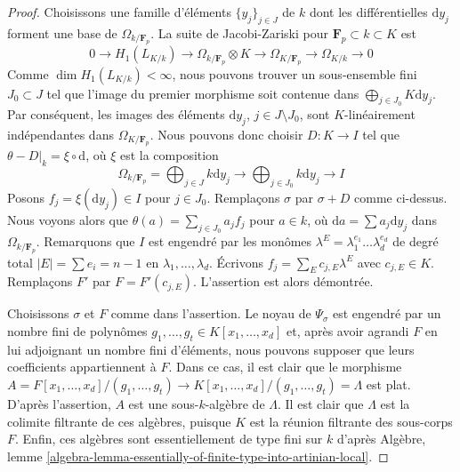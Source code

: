 \begin{proof}
\medskip\noindent
Choisissons une famille d'éléments $\{y_j\}_{j \in J}$ de $k$ dont les différentielles
$\text{d}y_j$ forment une base de $\Omega_{k/\mathbf{F}_p}$. La suite de Jacobi-Zariski
pour $\mathbf{F}_p \subset k \subset K$ est
$$
0 \to H_1(L_{K/k}) \to \Omega_{k/\mathbf{F}_p} \otimes K \to
\Omega_{K/\mathbf{F}_p} \to \Omega_{K/k} \to 0
$$
Comme $\dim H_1(L_{K/k}) < \infty$, nous pouvons trouver un sous-ensemble fini $J_0 \subset J$
tel que l'image du premier morphisme soit contenue dans
$\bigoplus_{j \in J_0} K\text{d}y_j$. Par conséquent, les images des éléments
$\text{d}y_j$, $j \in J \setminus J_0$, sont $K$-linéairement indépendantes
dans $\Omega_{K/\mathbf{F}_p}$. Nous pouvons donc choisir
$D : K \to I$ tel que $\theta - D|_k = \xi \circ \text{d}$,
où $\xi$ est la composition
$$
\Omega_{k/\mathbf{F}_p} = \bigoplus\nolimits_{j \in J} k \text{d}y_j
\longrightarrow \bigoplus\nolimits_{j \in J_0} k \text{d}y_j
\longrightarrow I
$$
Posons $f_j = \xi(\text{d}y_j) \in I$ pour $j \in J_0$.
Remplaçons $\sigma$ par $\sigma + D$ comme ci-dessus. Nous voyons alors que
$\theta(a) = \sum_{j \in J_0} a_j f_j$ pour $a \in k$, où
$\text{d}a = \sum a_j \text{d}y_j$ dans $\Omega_{k/\mathbf{F}_p}$.
Remarquons que $I$ est engendré par les monômes
$\lambda^E = \lambda_1^{e_1} \ldots \lambda_d^{e_d}$ de
degré total $|E| = \sum e_i = n - 1$ en $\lambda_1, \ldots, \lambda_d$.
Écrivons $f_j = \sum_E c_{j, E} \lambda^E$ avec $c_{j, E} \in K$.
Remplaçons $F'$ par $F = F'(c_{j, E})$. L'assertion est alors démontrée.

\medskip\noindent
Choisissons $\sigma$ et $F$ comme dans l'assertion. Le noyau de $\Psi_\sigma$ est
engendré par un nombre fini de polynômes
$g_1, \ldots, g_t \in K[x_1, \ldots, x_d]$ et, après avoir agrandi $F$ en lui adjoignant
un nombre fini d'éléments, nous pouvons supposer que leurs coefficients appartiennent à $F$.
Dans ce cas, il est clair que le morphisme
$A = F[x_1, \ldots, x_d]/(g_1, \ldots, g_t) \to
K[x_1, \ldots, x_d]/(g_1, \ldots, g_t) = \Lambda$ est plat.
D'après l'assertion, $A$ est une sous-$k$-algèbre de $\Lambda$.
Il est clair que $\Lambda$ est la colimite filtrante de ces
algèbres, puisque $K$ est la réunion filtrante des sous-corps $F$.
Enfin, ces algèbres sont essentiellement de type fini sur $k$ d'après
Algèbre, lemme
\ref{algebra-lemma-essentially-of-finite-type-into-artinian-local}.
\end{proof}

